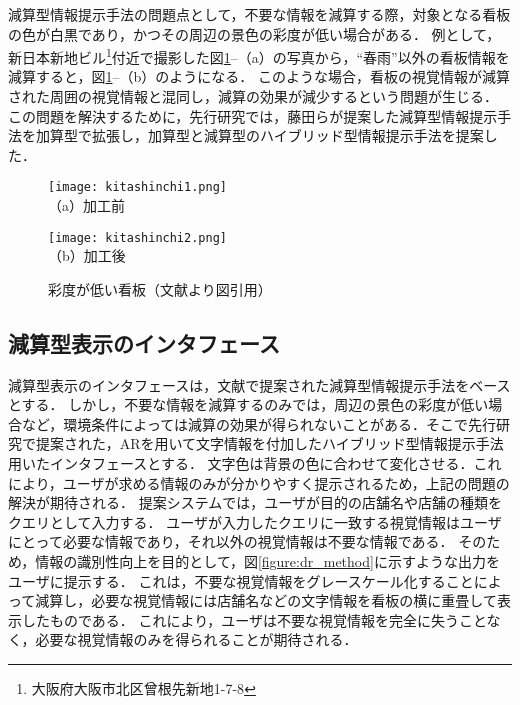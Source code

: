   減算型情報提示手法の問題点として，不要な情報を減算する際，対象となる看板の色が白黒であり，かつその周辺の景色の彩度が低い場合がある．
  例として，新日本新地ビル\footnote{大阪府大阪市北区曾根先新地1-7-8}付近で撮影した図\ref{figure:kitashinchi}--（a）の写真から，``春雨''以外の看板情報を減算すると，図\ref{figure:kitashinchi}--（b）のようになる．
  このような場合，看板の視覚情報が減算された周囲の視覚情報と混同し，減算の効果が減少するという問題が生じる．
  この問題を解決するために，先行研究\cite{Kitamura:2017a, Kitamura:2017b}では，藤田らが提案した減算型情報提示手法を加算型で拡張し，加算型と減算型のハイブリッド型情報提示手法を提案した．

  \begin{figure}[t]
    \begin{minipage}{0.49\hsize}
        \begin{center}
          \texttt{[image: kitashinchi1.png]}\\
          \small{（a）加工前}
        \end{center}
    \end{minipage}
    \begin{minipage}{0.49\hsize}
        \begin{center}
          \texttt{[image: kitashinchi2.png]}\\
          \small{（b）加工後}
        \end{center}
    \end{minipage}
    \vspace{2pt}
    \caption{彩度が低い看板（文献\cite{Kitamura:2017a}より図引用）}
    \label{figure:kitashinchi}
  \end{figure}

  \subsection{減算型表示のインタフェース}
    減算型表示のインタフェースは，文献\cite{Fujita:2013}で提案された減算型情報提示手法をベースとする．
    しかし，不要な情報を減算するのみでは，周辺の景色の彩度が低い場合など，環境条件によっては減算の効果が得られないことがある．そこで先行研究\cite{Kitamura:2017a, Kitamura:2017b}で提案された，ARを用いて文字情報を付加したハイブリッド型情報提示手法用いたインタフェースとする．
    文字色は背景の色に合わせて変化させる．これにより，ユーザが求める情報のみが分かりやすく提示されるため，上記の問題の解決が期待される．
    提案システムでは，ユーザが目的の店舗名や店舗の種類をクエリとして入力する．
    ユーザが入力したクエリに一致する視覚情報はユーザにとって必要な情報であり，それ以外の視覚情報は不要な情報である．
    そのため，情報の識別性向上を目的として，図\ref{figure:dr_method}に示すような出力をユーザに提示する．
    これは，不要な視覚情報をグレースケール化することによって減算し，必要な視覚情報には店舗名などの文字情報を看板の横に重畳して表示したものである．
    これにより，ユーザは不要な視覚情報を完全に失うことなく，必要な視覚情報のみを得られることが期待される．

